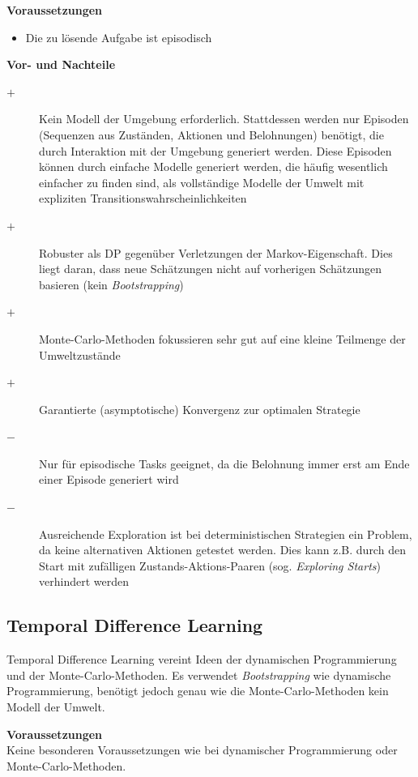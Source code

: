 \documentclass[10pt]{scrartcl}
\begin{document}
\vspace{1em}
\textbf{Voraussetzungen}
\begin{itemize}
\item Die zu lösende Aufgabe ist episodisch
\end{itemize}

\vspace{1em}
\textbf{Vor- und Nachteile}
\begin{description}
\item[$+$] Kein Modell der Umgebung erforderlich. Stattdessen werden nur Episoden (Sequenzen aus Zuständen, Aktionen und Belohnungen) benötigt, die durch Interaktion mit der Umgebung generiert werden. Diese Episoden können durch einfache Modelle generiert werden, die häufig wesentlich einfacher zu finden sind, als vollständige Modelle der Umwelt mit expliziten Transitionswahrscheinlichkeiten
\item[$+$] Robuster als DP gegenüber Verletzungen der Markov-Eigenschaft. Dies liegt daran, dass neue Schätzungen nicht auf vorherigen Schätzungen basieren (kein \emph{Bootstrapping})
\item[$+$] Monte-Carlo-Methoden fokussieren sehr gut auf eine kleine Teilmenge der Umweltzustände
\item[$+$] Garantierte (asymptotische) Konvergenz zur optimalen Strategie
\item[$-$] Nur für episodische Tasks geeignet, da die Belohnung immer erst am Ende einer Episode generiert wird
\item[$-$] Ausreichende Exploration ist bei deterministischen Strategien ein Problem, da keine alternativen Aktionen getestet werden. Dies kann z.B. durch den Start mit zufälligen Zustands-Aktions-Paaren (sog. \emph{Exploring Starts}) verhindert werden
\end{description}

\subsection{Temporal Difference Learning}
Temporal Difference Learning vereint Ideen der dynamischen Programmierung und der Monte-Carlo-Methoden. Es verwendet \emph{Bootstrapping} wie dynamische Programmierung, benötigt jedoch genau wie die Monte-Carlo-Methoden kein Modell der Umwelt.

\vspace{1em}
\textbf{Voraussetzungen} \\
Keine besonderen Voraussetzungen wie bei dynamischer Programmierung oder Monte-Carlo-Methoden.
\end{document}
